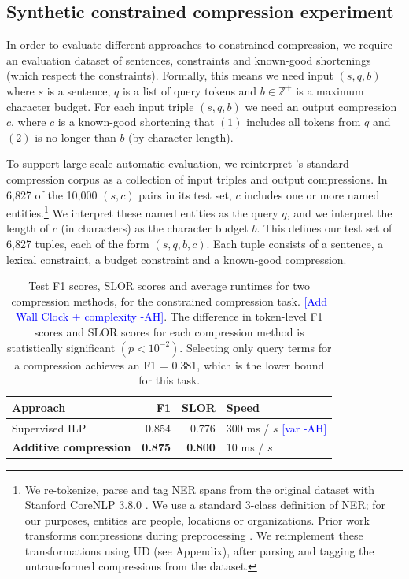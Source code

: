 \documentclass[11pt,a4paper]{article}
\newcommand{\ahcomment}[1]{\textcolor{blue}{[#1 -AH]}}
\begin{document}
\subsection{Synthetic constrained compression experiment}

In order to evaluate different approaches to constrained compression, we require an evaluation dataset of sentences, constraints and known-good shortenings (which respect the constraints). Formally, this means we need input $(s, q, b)$ where $s$ is a sentence, $q$ is a list of query tokens and $b \in \mathbb{Z}^{+}$ is a maximum character budget. For each input triple $(s,q,b)$ we need an output compression $c$, where $c$ is a known-good shortening that $(1)$ includes all tokens from $q$ and $(2)$ is no longer than $b$ (by character length). 

To support large-scale automatic evaluation, we reinterpret 
\citeauthor{filippova2013overcoming}'s
standard compression corpus
as a collection of input triples and output compressions.
In 6,827 of the 10,000 $(s,c)$ pairs in its test set,
$c$ includes one or more named entities.\footnote{We re-tokenize, parse and tag NER spans from the original dataset with Stanford CoreNLP 3.8.0 \cite{corenlp}. We use a standard 3-class definition of NER; for our purposes, entities are people, locations or organizations. Prior work transforms compressions during preprocessing \cite{filippova2013overcoming}. We reimplement these transformations using UD (see Appendix), after parsing and tagging the untransformed compressions from the dataset.}
We interpret these named entities as the query $q$,
and we interpret the length of $c$ (in characters) as the character budget $b$.
This defines our test set of 6,827 tuples, each of the form $(s,q,b,c)$. Each tuple consists of a sentence, a lexical constraint, a budget constraint and a
known-good compression.

\begin{table}[]
\begin{tabular}{lrrl}
\centering
Approach & F1 & SLOR &  Speed \\ \hline
Supervised ILP  &  0.854   &  0.776   &  300  ms / $s$  \ahcomment{var} \\
\textbf{Additive compression} &  \textbf{0.875}  & \textbf{0.800} & 10 ms / $s$  \\
\end{tabular}
\caption{Test F1 scores, SLOR scores and average runtimes for two compression methods, for the constrained compression task. \ahcomment{Add Wall Clock + complexity}. The difference in token-level F1 scores and SLOR scores for each compression method is statistically significant {\small $(p < 10^{-2})$}. Selecting only query terms for a compression achieves an F1 = 0.381, which is the lower bound for this task.}
\label{t:results}
\end{table}
\end{document}
